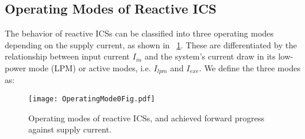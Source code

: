 \subsection{Operating Modes of Reactive ICS}

The behavior of reactive ICSs can be classified into three operating modes depending on the supply current, as shown in \figurename{~\ref{fig:operatingModes}}. These are differentiated by the relationship between input current $I_{in}$ and the system's current draw in its low-power mode (LPM) or active modes, i.e. $I_{lpm}$ and $I_{exe}$. We define the three modes as:

\begin{figure}[!t]
  \centering
  \texttt{[image: OperatingMode0Fig.pdf]}
  \caption{Operating modes of reactive ICSs, and achieved forward progress against supply current.}
  \label{fig:operatingModes}
\end{figure}

